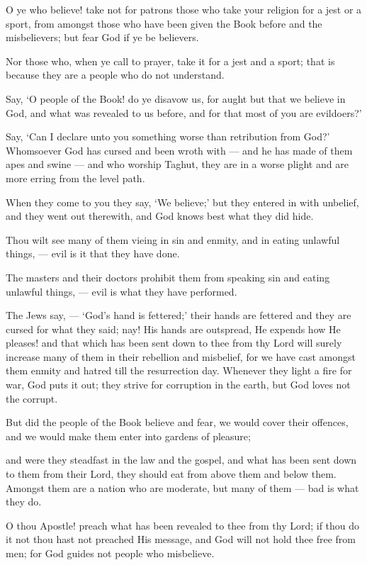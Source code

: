\documentclass[fontsize=14pt, letterpaper, notitlepage, openany, DIV=12]{scrbook} %
\begin{document}
\noindent[5:57]
O ye who believe! take not for patrons those who take your religion for a jest or a sport,
from amongst those who have been given the Book before and the misbelievers; but fear God if
ye be believers.

\noindent[5:58]
Nor those who, when ye call to prayer, take it for a jest and a sport; that is because they
are a people who do not understand.

\noindent[5:59]
Say, `O people of the Book! do ye disavow us, for aught but that we believe in God, and
what was revealed to us before, and for that most of you are evildoers?'

\noindent[5:60]
Say, `Can I declare unto you something worse than retribution from God?' Whomsoever
God has cursed and been wroth with --- and he has made of them apes and swine --- and who
worship Taghut, they are in a worse plight and are more erring from the level path.

\noindent[5:61]
When they come to you they say, `We believe;' but they entered in with unbelief, and
they went out therewith, and God knows best what they did hide.

\noindent[5:62]
Thou wilt see many of them vieing in sin and enmity, and in eating unlawful things, ---
evil is it that they have done.

\noindent[5:63]
The masters and their doctors prohibit them from speaking sin and eating unlawful
things, --- evil is what they have performed.

\noindent[5:64]
The Jews say, --- `God's hand is fettered;' their hands are fettered and they are cursed for
what they said; nay! His hands are outspread, He expends how He pleases! and that which has
been sent down to thee from thy Lord will surely increase many of them in their rebellion and
misbelief, for we have cast amongst them enmity and hatred till the resurrection day. Whenever
they light a fire for war, God puts it out; they strive for corruption in the earth, but God loves not
the corrupt.

\noindent[5:65]
But did the people of the Book believe and fear, we would cover their offences, and we
would make them enter into gardens of pleasure;

\noindent[5:66]
and were they steadfast in the law and the gospel, and what has been sent down to them
from their Lord, they should eat from above them and below them. Amongst them are a nation
who are moderate, but many of them --- bad is what they do.

\noindent[5:67]
O thou Apostle! preach what has been revealed to thee from thy Lord; if thou do it not
thou hast not preached His message, and God will not hold thee free from men; for God guides
not people who misbelieve.
\end{document}
